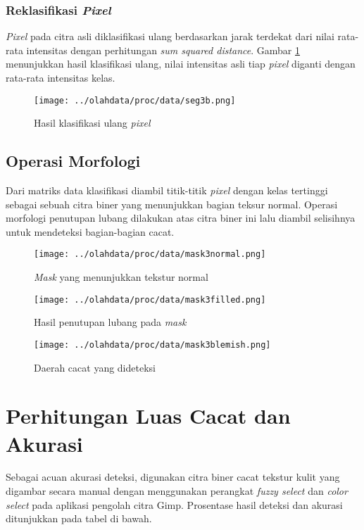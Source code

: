 \documentclass[laporan.tex]{subfiles}
\begin{document}
\subsubsection{Reklasifikasi \emph{Pixel}}

\emph{Pixel} pada citra asli diklasifikasi ulang berdasarkan jarak terdekat dari nilai rata-rata intensitas dengan perhitungan \emph{sum squared distance}. Gambar \ref{fig:classfinimg} menunjukkan hasil klasifikasi ulang, nilai intensitas asli tiap \emph{pixel} diganti dengan rata-rata intensitas kelas.

\begin{figure}[h]
\centering
\texttt{[image: ../olahdata/proc/data/seg3b.png]}
\caption{Hasil klasifikasi ulang \emph{pixel}}
\label{fig:classfinimg}
\end{figure}

\subsection{Operasi Morfologi}

Dari matriks data klasifikasi diambil titik-titik \emph{pixel} dengan kelas tertinggi sebagai sebuah citra biner yang menunjukkan bagian teksur normal. Operasi morfologi penutupan lubang dilakukan atas citra biner ini lalu diambil selisihnya untuk mendeteksi bagian-bagian cacat.

\begin{figure}[h]
\centering
\texttt{[image: ../olahdata/proc/data/mask3normal.png]}
\caption{\emph{Mask} yang menunjukkan tekstur normal}
\end{figure}

\begin{figure}[h]
\centering
\texttt{[image: ../olahdata/proc/data/mask3filled.png]}
\caption{Hasil penutupan lubang pada \emph{mask}}
\end{figure}

\begin{figure}[h]
\centering
\texttt{[image: ../olahdata/proc/data/mask3blemish.png]}
\caption{Daerah cacat yang dideteksi}
\end{figure}

\section{Perhitungan Luas Cacat dan Akurasi}

Sebagai acuan akurasi deteksi, digunakan citra biner cacat tekstur kulit yang digambar secara manual dengan menggunakan perangkat \emph{fuzzy select} dan \emph{color select} pada aplikasi pengolah citra Gimp. Prosentase hasil deteksi dan akurasi ditunjukkan pada tabel di bawah.
\end{document}
